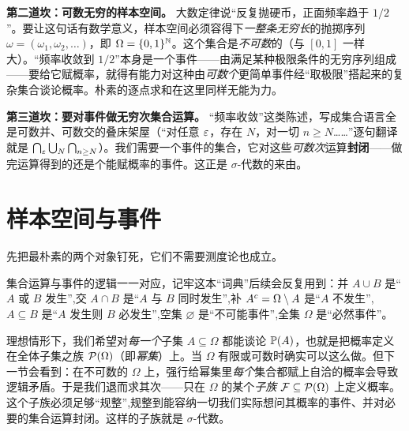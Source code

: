 \textbf{第二道坎：可数无穷的样本空间。} 大数定律说``反复抛硬币，正面频率趋于 $1/2$''。要让这句话有数学意义，样本空间必须容得下\emph{一整条无穷长}的抛掷序列 $\omega=(\omega_1,\omega_2,\dots)$，即 $\Omega=\{0,1\}^{\mathbb{N}}$。这个集合是\emph{不可数}的（与 $[0,1]$ 一样大）。``频率收敛到 $1/2$''本身是一个事件——由满足某种极限条件的无穷序列组成——要给它赋概率，就得有能力对这种由\emph{可数个}更简单事件经``取极限''搭起来的复杂集合谈论概率。朴素的逐点求和在这里同样无能为力。

\textbf{第三道坎：要对事件做无穷次集合运算。} ``频率收敛''这类陈述，写成集合语言全是可数并、可数交的叠床架屋（``对任意 $\varepsilon$，存在 $N$，对一切 $n\ge N$……''逐句翻译就是 $\bigcap_\varepsilon\bigcup_N\bigcap_{n\ge N}$）。我们需要一个事件的集合，它对这些\emph{可数次}运算\textbf{封闭}——做完运算得到的还是个能赋概率的事件。这正是 $\sigma$-代数的来由。


\section{样本空间与事件}
\label{sec:measure-sample}

先把最朴素的两个对象钉死，它们不需要测度论也成立。


集合运算与事件的逻辑一一对应，记牢这本``词典''后续会反复用到：并 $A\cup B$ 是``$A$ 或 $B$ 发生'',交 $A\cap B$ 是``$A$ 与 $B$ 同时发生'',补 $A^c=\Omega\setminus A$ 是``$A$ 不发生'',$A\subseteq B$ 是``$A$ 发生则 $B$ 必发生'',空集 $\varnothing$ 是``不可能事件'',全集 $\Omega$ 是``必然事件''。

理想情形下，我们希望对\emph{每一个}子集 $A\subseteq\Omega$ 都能谈论 $\mathbb{P}\!\left(A\right)$，也就是把概率定义在全体子集之族 $\mathcal{P}(\Omega)$（即\emph{幂集}）上。当 $\Omega$ 有限或可数时确实可以这么做。但下一节会看到：在不可数的 $\Omega$ 上，强行给幂集里\emph{每个}集合都赋上自洽的概率会导致逻辑矛盾。于是我们退而求其次——只在 $\Omega$ 的某个\emph{子族} $\mathcal{F}\subseteq\mathcal{P}(\Omega)$ 上定义概率。这个子族必须足够``规整'',规整到能容纳一切我们实际想问其概率的事件、并对必要的集合运算封闭。这样的子族就是 $\sigma$-代数。

